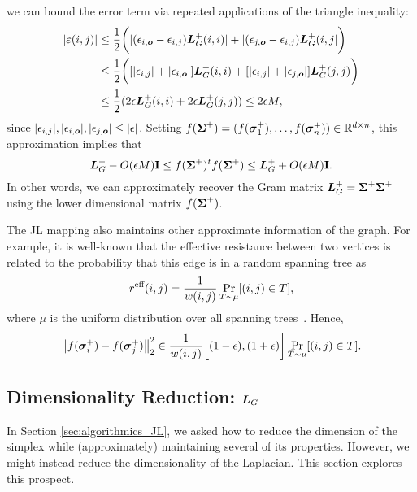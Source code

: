 we can bound the error term via repeated applications of the triangle inequality: 
\begin{align*}
|\varepsilon(i,j)|& \leq \frac{1}{2}\bigg(|(\epsilon_{i,\vb*{o}}-\epsilon_{i,j})\vb*{L}_G^+(i,i)| + |(\epsilon_{j,\vb*{o}}-\epsilon_{i,j})\vb*{L}_G^+(i,j|\bigg) \\
& \leq \frac{1}{2}\bigg([|\epsilon_{i,j}|+|\epsilon_{i,\vb*{o}}|]\vb*{L}_G^+(i,i) + [|\epsilon_{i,j}|+|\epsilon_{j,\vb*{o}}|]\vb*{L}_G^+(j,j)\bigg) \\
&\leq \frac{1}{2} ( 2\epsilon\vb*{L}_G^+(i,i) + 2\epsilon\vb*{L}_G^+(j,j) ) \leq 2\epsilon M,
\end{align*}
since $|\epsilon_{i,j}|, |\epsilon_{i,\vb*{o}}|,|\epsilon_{j,\vb*{o}}|\leq |\epsilon|$. Setting $f(\boldsymbol{\Sigma}^+) = (f(\vb*{\sigma}_1^+),\dots,f(\vb*{\sigma}_n^+))\in \mathbb{R}^{d\times n}$, this approximation implies that 
\begin{equation*}
\vb*{L}_G^+ - O(\epsilon M)\vb{I} \leq f(\boldsymbol{\Sigma}^+)^t f(\boldsymbol{\Sigma}^+) \leq \vb*{L}_G^+ + O(\epsilon M)\vb{I}. 
\end{equation*}
In other words, we can approximately recover the Gram matrix $\vb*{L}_G^+=\boldsymbol{\Sigma}^+\boldsymbol{\Sigma}^+$ using the lower dimensional matrix $f(\boldsymbol{\Sigma}^+)$. 

The JL mapping also maintains other approximate information of the graph.  For  example,  it is well-known that the effective resistance between two vertices is related to the probability that this edge  is in a random  spanning  tree as 
\begin{equation*}
	r^{\textnormal{eff}}(i,j) = \frac{1}{w(i,j)} \Pr_{T\sim \mu}[(i,j)\in T],
\end{equation*}
where $\mu$ is the uniform distribution over all spanning trees~\cite{burton1993local}. Hence, 
\begin{equation*}
\norm{f(\vb*{\sigma}_i^+)-f(\vb*{\sigma}_j^+)}_2^2 \in \frac{1}{w(i,j)}\bigg[(1-\epsilon),(1+\epsilon)\bigg]\Pr_{T\sim \mu}[(i,j)\in T].
\end{equation*}
	

\subsection{Dimensionality Reduction: \texorpdfstring{$\vb*{L}_G$}{the Laplacian}}
\label{sec:algorithmics_low_rank}
In Section  \ref{sec:algorithmics_JL}, we asked how to reduce the  dimension of the  simplex  while (approximately) maintaining several of its  properties. However,  we might instead  reduce the dimensionality of the  Laplacian. This section explores this prospect. 


